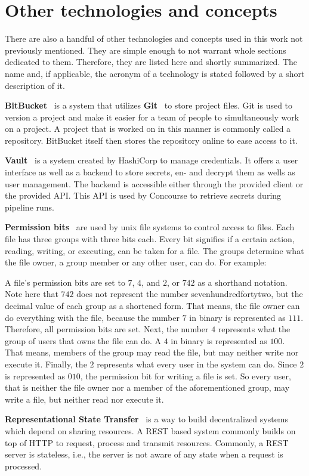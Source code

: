 \section{Other technologies and concepts}\label{sec:technologies-used}

There are also a handful of other technologies and concepts used in this work not previously mentioned.
They are simple enough to not warrant whole sections dedicated to them.
Therefore, they are listed here and shortly summarized.
The name and, if applicable, the acronym of a technology is stated followed by a short description of it.

\textbf{BitBucket}~\cite{bitbucket} is a system that utilizes \textbf{Git}~\cite{git} to store project files.
Git is used to version a project and make it easier for a team of people to simultaneously work on a project.
A project that is worked on in this manner is commonly called a repository.
BitBucket itself then stores the repository online to ease access to it.

\textbf{Vault}~\cite{vault} is a system created by HashiCorp to manage credentials.
It offers a user interface as well as a backend to store secrets, en- and decrypt them as wells as user management.
The backend is accessible either through the provided client or the provided API.
This API is used by Concourse to retrieve secrets during pipeline runs.

\textbf{Permission bits}~\cite{unix-file-permissions} are used by unix file systems to control access to files.
Each file has three groups with three bits each.
Every bit signifies if a certain action, reading, writing, or executing, can be taken for a file.
The groups determine what the file owner, a group member or any other user, can do.
For example:

A file's permission bits are set to $7$, $4$, and $2$, or $742$ as a shorthand notation.
Note here that $742$ does not represent the number sevenhundredfortytwo, but the decimal value of each group as a shortened form.
That means, the file owner can do everything with the file, because the number $7$ in binary is represented as $111$.
Therefore, all permission bits are set.
Next, the number $4$ represents what the group of users that owns the file can do.
A $4$ in binary is represented as $100$.
That means, members of the group may read the file, but may neither write nor execute it.
Finally, the $2$ represents what every user in the system can do.
Since $2$ is represented as $010$, the permission bit for writing a file is set.
So every user, that is neither the file owner nor a member of the aforementioned group, may write a file, but neither read nor execute it.

\textbf{Representational State Transfer}~\cite{extending-representation-state-transfer} is a way to build decentralized systems which depend on sharing resources.
A REST based system commonly builds on top of HTTP to request, process and transmit resources.
Commonly, a REST server is stateless, i.e., the server is not aware of any state when a request is processed.

